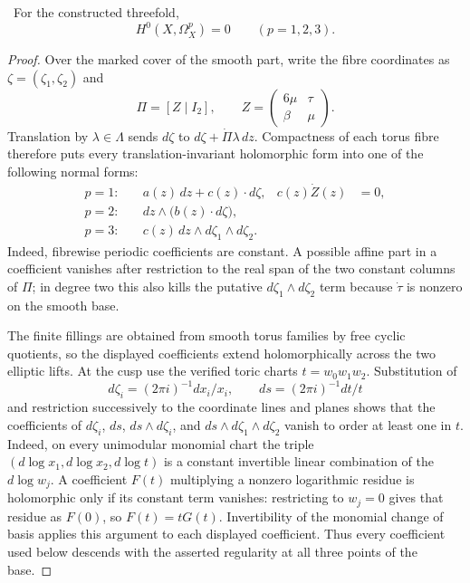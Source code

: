 \begin{proposition}
\label{prop:workbench-holomorphic-form-vanishing}
\Verified\ For the constructed threefold,
\[
 H^0(X,\Omega_X^p)=0\qquad (p=1,2,3).
\]
\end{proposition}

\begin{proof}
Over the marked cover of the smooth part, write the fibre coordinates as
$\zeta=(\zeta_1,\zeta_2)$ and
\[
 \Pi=[Z\mid I_2],\qquad
 Z=\begin{pmatrix}6\mu&\tau\\ \beta&\mu\end{pmatrix}.
\]
Translation by $\lambda\in\Lambda$ sends
$d\zeta$ to $d\zeta+\dot\Pi\lambda\,dz$.  Compactness of each torus fibre
therefore puts every translation-invariant holomorphic form into one of the
following normal forms:
\begin{align*}
 p=1:&\quad a(z)\,dz+c(z)\cdot d\zeta,
       &c(z)\dot Z(z)&=0,\\
 p=2:&\quad dz\wedge\bigl(b(z)\cdot d\zeta\bigr),\\
 p=3:&\quad c(z)\,dz\wedge d\zeta_1\wedge d\zeta_2.
\end{align*}
Indeed, fibrewise periodic coefficients are constant.  A possible affine
part in a coefficient vanishes after restriction to the real span of the
two constant columns of $\Pi$; in degree two this also kills the putative
$d\zeta_1\wedge d\zeta_2$ term because $\dot\tau$ is nonzero on the smooth
base.

The finite fillings are obtained from smooth torus families by free cyclic
quotients, so the displayed coefficients extend holomorphically across the
two elliptic lifts.  At the cusp use the verified toric charts
$t=w_0w_1w_2$.  Substitution of
\[
 d\zeta_i=(2\pi i)^{-1}dx_i/x_i,
 \qquad ds=(2\pi i)^{-1}dt/t
\]
and restriction successively to the coordinate lines and planes shows that
the coefficients of $d\zeta_i$, $ds$, $ds\wedge d\zeta_i$, and
$ds\wedge d\zeta_1\wedge d\zeta_2$ vanish to order at least one in $t$.
Indeed, on every unimodular monomial chart the triple
$(d\log x_1,d\log x_2,d\log t)$ is a constant invertible linear combination
of the $d\log w_j$.  A coefficient $F(t)$ multiplying a nonzero logarithmic
residue is holomorphic only if its constant term vanishes: restricting to
$w_j=0$ gives that residue as $F(0)$, so $F(t)=tG(t)$.  Invertibility of the
monomial change of basis applies this argument to each displayed
coefficient.
Thus every coefficient used below descends with the asserted regularity at
all three points of the base.


\end{proof}
